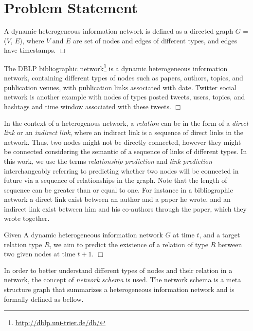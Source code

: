 \section{Problem Statement}

\begin{definition}
A dynamic heterogeneous information network is defined as a directed graph $G$ = ($V$, $E$), where $V$ and $E$ are set of nodes and edges of different types, and edges have timestamps. $\Box$ 
\end{definition}

\begin{example}
The DBLP bibliographic network\footnote{\url{http://dblp.uni-trier.de/db/}} is a dynamic heterogeneous information network, containing different types of nodes such as papers, authors, topics, and publication venues, with publication links associated with date. Twitter social network is another example with nodes of types posted tweets, users, topics, and hashtags and time window associated with these tweets. $\Box$
\end{example}

In the context of a heterogenous network, a \textit{relation} can be in the form of a \textit{direct link} or an \textit{indirect link}, where an indirect link is a sequence of direct links in the network. Thus, two nodes might not be directly connected, however they might be connected considering the semantic of a sequence of links of different types. In this work, we use the terms \textit{relationship prediction} and \textit{link prediction} interchangeably referring to predicting whether two nodes will be connected in future via a sequence of relationships in the graph. Note that the length of sequence can be greater than or equal to one. For instance in a bibliographic network a direct link exist between an author and a paper he wrote, and an indirect link exist between him and his co-authors through the paper, which they wrote together.

\begin{definition}\label{problemdef}
Given A dynamic heterogeneous information network $G$ at time $t$, and a target relation type $R$, we aim to predict the existence of a relation of type $R$ between two given nodes at time $t+1$. $\Box$
 \end{definition}

In order to better understand different types of nodes and their relation in a network, the concept of \textit{network schema} \cite{sun2011pathsim} is used. The network schema is a meta structure graph that summarizes a heterogeneous information network and is formally defined as bellow.


